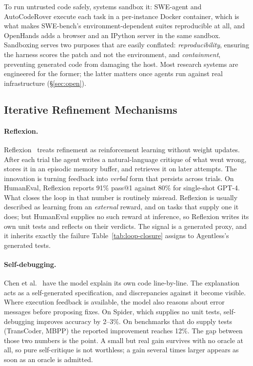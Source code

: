 \documentclass[
  english,        %
  font=times,     %
  twocolumn,      %
]{tumarticle}
\begin{document}
To run untrusted code safely, systems sandbox it: SWE-agent and AutoCodeRover
execute each task in a per-instance Docker container, which is what makes
SWE-bench's environment-dependent suites reproducible at all, and OpenHands adds a
browser and an IPython server in the same sandbox. Sandboxing serves two purposes
that are easily conflated: \emph{reproducibility}, ensuring the harness scores the
patch and not the environment, and \emph{containment}, preventing generated code
from damaging the host. Most research systems are engineered for the former; the
latter matters once agents run against real infrastructure (\S\ref{sec:open}).

\subsection{Iterative Refinement Mechanisms}
\label{sec:refinement-mechanisms}

\paragraph{Reflexion.}
Reflexion~\cite{shinn2023reflexion} treats refinement as reinforcement learning
without weight updates. After each trial the agent writes a natural-language
critique of what went wrong, stores it in an episodic memory buffer, and retrieves
it on later attempts. The innovation is turning feedback into \emph{verbal} form
that persists across trials. On HumanEval, Reflexion reports 91\% pass@1 against
80\% for single-shot GPT-4. What closes the loop in that number is routinely
misread. Reflexion is usually described as learning from an \emph{external}
reward, and on tasks that supply one it does; but HumanEval supplies no such
reward at inference, so Reflexion writes its own unit tests and reflects on their
verdicts. The signal is a generated proxy, and it inherits exactly the failure
Table~\ref{tab:loop-closure} assigns to Agentless's generated tests.

\paragraph{Self-debugging.}
Chen et al.~\cite{chen2024selfdebug} have the model explain its own code
line-by-line. The explanation acts as a self-generated specification, and
discrepancies against it become visible. Where execution feedback is available,
the model also reasons about error messages before proposing fixes. On Spider,
which supplies no unit tests, self-debugging improves accuracy by 2--3\%. On
benchmarks that do supply tests (TransCoder, MBPP) the reported improvement
reaches 12\%. The gap between those two numbers is the point. A small but real
gain survives with no oracle at all, so pure self-critique is not worthless; a
gain several times larger appears as soon as an oracle is admitted.
\end{document}
